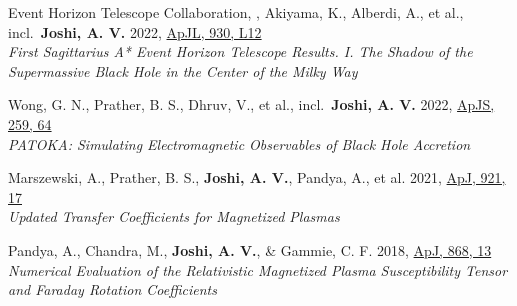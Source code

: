 \item Event Horizon Telescope Collaboration, , Akiyama, K., Alberdi, A., et al., incl.\ \textbf{Joshi, A. V.} 2022, \href{https://ui.adsabs.harvard.edu/abs/2022ApJ...930L..12E}{ApJL, 930, L12}\\\textit{First Sagittarius A* Event Horizon Telescope Results. I. The Shadow of the Supermassive Black Hole in the Center of the Milky Way}

\item Wong, G. N., Prather, B. S., Dhruv, V., et al., incl.\ \textbf{Joshi, A. V.} 2022, \href{https://ui.adsabs.harvard.edu/abs/2022ApJS..259...64W}{ApJS, 259, 64}\\\textit{PATOKA\@: Simulating Electromagnetic Observables of Black Hole Accretion}

\item Marszewski, A., Prather, B. S., \textbf{Joshi, A. V.}, Pandya, A., et al. 2021, \href{https://ui.adsabs.harvard.edu/abs/2021ApJ...921...17M}{ApJ, 921, 17}\\\textit{Updated Transfer Coefficients for Magnetized Plasmas}

\item Pandya, A., Chandra, M., \textbf{Joshi, A. V.}, \& Gammie, C. F. 2018, \href{https://ui.adsabs.harvard.edu/abs/2018ApJ...868...13P}{ApJ, 868, 13}\\\textit{Numerical Evaluation of the Relativistic Magnetized Plasma Susceptibility Tensor and Faraday Rotation Coefficients}

